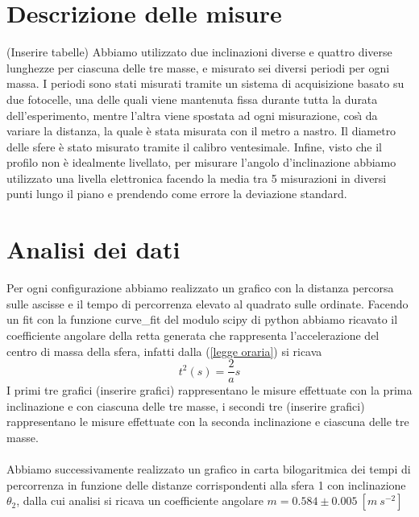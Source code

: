 \documentclass{article}
\begin{document}
	\section{Descrizione delle misure}
		(Inserire tabelle) Abbiamo utilizzato due inclinazioni diverse e quattro diverse lunghezze per ciascuna delle tre masse, e misurato sei diversi periodi per ogni massa.
		I periodi sono stati misurati tramite un sistema di acquisizione basato su due fotocelle, una delle quali viene mantenuta fissa durante tutta la durata dell'esperimento, mentre l'altra viene spostata ad ogni misurazione, cos\`{\i} da variare la distanza, la quale è stata misurata con il metro a nastro. Il diametro delle sfere è stato misurato tramite il calibro ventesimale. Infine, visto che il profilo non \`{e} idealmente livellato, per misurare l'angolo d'inclinazione abbiamo utilizzato una livella elettronica facendo la media tra 5 misurazioni in diversi punti lungo il piano e prendendo come errore la deviazione standard.
	
	\section{Analisi dei dati}
		Per ogni configurazione abbiamo realizzato un grafico con la distanza percorsa sulle ascisse e il tempo di percorrenza elevato al quadrato sulle ordinate. Facendo un fit con la funzione curve\_fit del modulo scipy di python abbiamo ricavato il coefficiente angolare della retta generata che rappresenta l'accelerazione del centro di massa della sfera, infatti dalla (\ref{legge oraria}) si ricava
		\begin{equation}
			t^2(s) = \frac{2}{a}s
		\end{equation}
		I primi tre grafici (inserire grafici) rappresentano le misure effettuate con la prima inclinazione e con ciascuna delle tre masse, i secondi tre (inserire grafici) rappresentano le misure effettuate con la seconda inclinazione e ciascuna delle tre masse.\\\\
		Abbiamo successivamente realizzato un grafico in carta bilogaritmica dei tempi di percorrenza in funzione delle distanze corrispondenti alla sfera 1 con inclinazione $\theta_2$, dalla cui analisi si ricava un coefficiente angolare $m = 0.584\pm0.005\:[m\:s^{-2}]$
		
\end{document}
